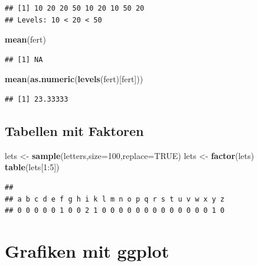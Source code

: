 \documentclass[]{article}
\newenvironment{Shaded}{\begin{snugshade}}{\end{snugshade}}
\newcommand{\KeywordTok}[1]{\textcolor[rgb]{0.13,0.29,0.53}{\textbf{{#1}}}}
\newcommand{\DataTypeTok}[1]{\textcolor[rgb]{0.13,0.29,0.53}{{#1}}}
\newcommand{\DecValTok}[1]{\textcolor[rgb]{0.00,0.00,0.81}{{#1}}}
\newcommand{\StringTok}[1]{\textcolor[rgb]{0.31,0.60,0.02}{{#1}}}
\newcommand{\OtherTok}[1]{\textcolor[rgb]{0.56,0.35,0.01}{{#1}}}
\newcommand{\NormalTok}[1]{{#1}}
\begin{document}
\begin{verbatim}
## [1] 10 20 20 50 10 20 10 50 20
## Levels: 10 < 20 < 50
\end{verbatim}

\begin{Shaded}
\begin{Highlighting}[]
\KeywordTok{mean}\NormalTok{(fert)}
\end{Highlighting}
\end{Shaded}

\begin{verbatim}
## [1] NA
\end{verbatim}

\begin{Shaded}
\begin{Highlighting}[]
\KeywordTok{mean}\NormalTok{(}\KeywordTok{as.numeric}\NormalTok{(}\KeywordTok{levels}\NormalTok{(fert)[fert]))}
\end{Highlighting}
\end{Shaded}

\begin{verbatim}
## [1] 23.33333
\end{verbatim}

\subsection{Tabellen mit Faktoren}\label{tabellen-mit-faktoren}

\begin{Shaded}
\begin{Highlighting}[]
\NormalTok{lets <-}\StringTok{ }\KeywordTok{sample}\NormalTok{(letters,}\DataTypeTok{size=}\DecValTok{100}\NormalTok{,}\DataTypeTok{replace=}\OtherTok{TRUE}\NormalTok{)}
\NormalTok{lets <-}\StringTok{ }\KeywordTok{factor}\NormalTok{(lets)}
\KeywordTok{table}\NormalTok{(lets[}\DecValTok{1}\NormalTok{:}\DecValTok{5}\NormalTok{])}
\end{Highlighting}
\end{Shaded}

\begin{verbatim}
## 
## a b c d e f g h i k l m n o p q r s t u v w x y z 
## 0 0 0 0 0 1 0 0 2 1 0 0 0 0 0 0 0 0 0 0 0 0 0 1 0
\end{verbatim}

\section{Grafiken mit ggplot}\label{grafiken-mit-ggplot}
\end{document}
